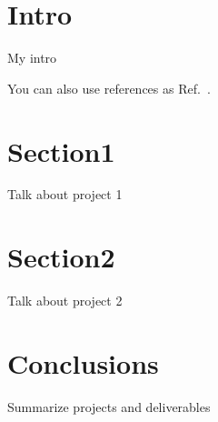 
\section{Intro}
My intro

You can also use references as Ref.~\cite{P5}.

\section{Section1}
Talk about project 1

\section{Section2}
Talk about project 2

\section{Conclusions}
Summarize projects and deliverables